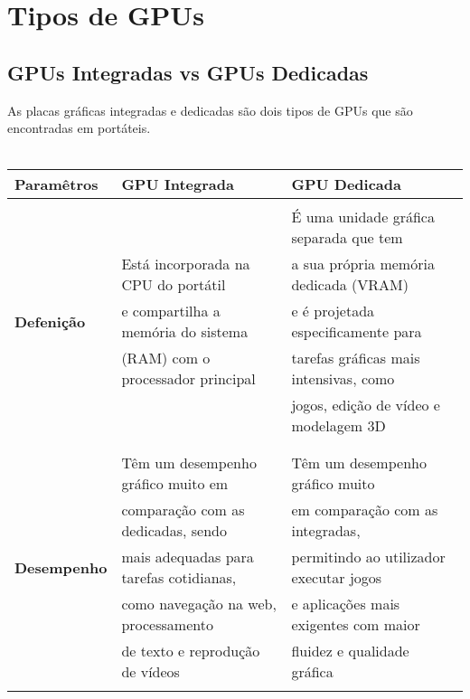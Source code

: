 \documentclass[a4paper,11pt,]{report}
\begin{document}
\chapter{Tipos de GPUs}
\section{GPUs Integradas vs GPUs Dedicadas}
As placas gráficas integradas e dedicadas são dois tipos de GPUs que são encontradas em portáteis.
\\\\
\begin{tabular}{|l|l|l|}
%
\hline
	     \textbf{Paramêtros} &\textbf{GPU Integrada}&\textbf{GPU Dedicada} \\ \hline
&&\\
& & É uma unidade gráfica separada que tem\\
&Está incorporada na CPU do portátil& a sua própria memória dedicada (VRAM)\\
\textbf{Defenição} &e compartilha a memória do sistema& e é projetada especificamente para\\
& (RAM) com o processador principal& tarefas gráficas mais intensivas, como\\
&& jogos, edição de vídeo e modelagem 3D\\ 
&&\\ \hline
&&\\
&Têm um desempenho gráfico muito em&Têm um desempenho gráfico muito\\
&comparação com as dedicadas, sendo&em comparação com as integradas,\\
\textbf{Desempenho}&mais adequadas para tarefas cotidianas,& permitindo ao utilizador executar jogos\\
&como navegação na web, processamento& e aplicações mais exigentes com maior\\
&de texto e reprodução de vídeos& fluidez e qualidade gráfica\\ 
&&\\ \hline 
%
\end{tabular}
\end{document}
